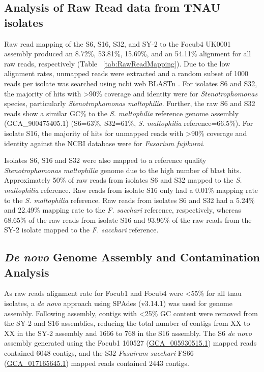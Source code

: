 \subsection{Analysis of Raw Read data from TNAU isolates}

Raw read mapping of the S6, S16, S32, and SY-2 to the \ac{Focub4} UK0001 assembly produced an 8.72\%, 53.81\%, 15.69\%, and an 54.11\% alignment for all raw reads, respectively (Table ~\ref{tab:RawReadMapping}). Due to the low alignment rates, unmapped reads were extracted and a random subset of 1000 reads per isolate was searched using \acf{ncbi} web BLASTn \parencite{Nih2014}. For isolates S6 and S32, the majority of hits with >90\% coverage and identity were for \textit{Stenotrophomonas} species, particularly \textit{Stenotrophomonas maltophilia}. Further, the raw S6 and S32 reads show a similar GC\% to the \textit{S. maltophilia }reference genome assembly (GCA\_900475405.1) (S6=63\%, S32=61\%, \textit{S. maltophilia} reference=66.5\%). For isolate S16, the majority of hits for unmapped reads with >90\% coverage and identity against the NCBI database were for \textit{Fusarium fujikuroi}. 

\bigskip

\bigskip

Isolates S6, S16 and S32 were also mapped to a reference quality \textit{Stenotrophomonas maltophilia} genome due to the high number of blast hits. Approximately 50\% of raw reads from isolates S6 and S32 mapped to the \textit{S. maltophilia} reference. Raw reads from isolate S16 only had a 0.01\% mapping rate to the \textit{S. maltophilia} reference. Raw reads from isolates S6 and S32 had a 5.24\% and 22.49\% mapping rate to the \textit{F. sacchari} reference, respectively, whereas 68.65\% of the raw reads from isolate S16 and 93.96\% of the raw reads from the SY-2 isolate mapped to the \textit{F. sacchari} reference.

\subsection{\textit{De novo} Genome Assembly and Contamination Analysis}

As raw reads alignment rate for \ac{Focub1} \parencite{Asai2019} and \ac{Focub4} \parencite{Warmington2019} were <55\% for all \ac{tnau} isolates, a \textit{de novo} approach using SPAdes (v3.14.1) was used for genome assembly. Following assembly, contigs with \textless 25\% GC content were removed from the SY-2 and S16 assemblies, reducing the total number of contigs from XX to XX in the SY-2 assembly and 1666 to 768 in the S16 assembly. The S6 \textit{de novo} assembly generated using the \ac{Focub1} 160527 (\href{https://www.ncbi.nlm.nih.gov/datasets/genome/GCA_005930515.1/}{GCA\_005930515.1}) mapped reads contained 6048 contigs, and the S32 \textit{Fusairum sacchari} FS66 (\href{https://www.ncbi.nlm.nih.gov/datasets/genome/GCA_017165645.1/}{GCA\_017165645.1}) mapped reads contained 2443 contigs. 

